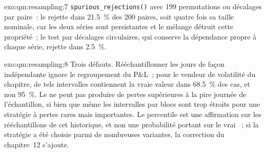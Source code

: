 \begin{solution}{exo:qm:resampling:7}
\texttt{spurious\_rejections()} avec 199 permutations ou décalages par paire~: le  rejette dans 21.5~\% des 200 paires, soit quatre
fois sa taille nominale, car les deux séries sont persistantes et le mélange détruit cette propriété~; le test par décalages circulaires, qui conserve la dépendance propre à chaque
série, rejette dans 2.5~\%.
\end{solution}

\begin{solution}{exo:qm:resampling:8}
Trois défauts. Rééchantillonner les jours de façon indépendante ignore le regroupement du P\&L~; pour le vendeur de volatilité du chapitre, de tels intervalles contiennent
la vraie valeur dans 68.5~\% des cas, et non 95~\%. Le  ne peut pas produire de pertes supérieures à la pire journée de l'échantillon, si bien que même les intervalles par
blocs sont trop étroits pour une stratégie à pertes rares mais importantes. Le percentile est une affirmation sur les rééchantillons de cet historique, et non une
probabilité portant sur le vrai ~; si la stratégie a été choisie parmi de nombreuses variantes, la correction du chapitre~12 s'ajoute.
\end{solution}

